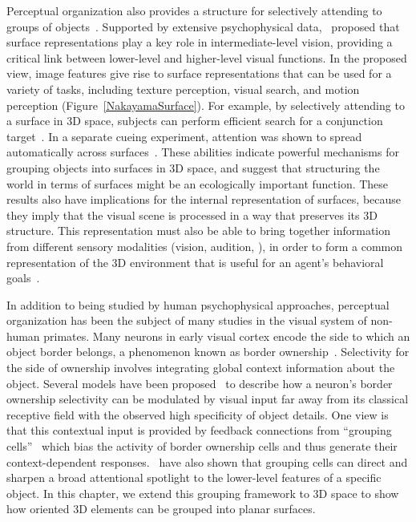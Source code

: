 Perceptual organization also provides a structure for selectively attending to groups of objects~\citep{Treisman_Gelade80}. Supported by extensive psychophysical data,~\citet{Nakayama_etal95} proposed that surface representations play a key role in intermediate-level vision, 
%
providing a critical link
between lower-level and higher-level visual functions.
In the proposed view, image features give rise to surface representations that can be used for a variety of tasks, including texture perception, visual search, and motion perception (Figure~\ref{NakayamaSurface}).
%
For example, by selectively attending to a surface in 3D space, subjects can perform efficient search for a conjunction target~\citep{Nakayama_Silverman86}. In a separate cueing experiment, attention was shown to spread automatically across surfaces~\citep{He_Nakayama95}. These abilities indicate powerful mechanisms for grouping objects into surfaces in 3D space, and suggest that structuring the world in terms of surfaces might be an ecologically important function. These results also have implications for the internal representation of surfaces, because they imply that the visual scene is processed in a way that preserves its 3D
structure. This representation must also be able to bring together
information from different sensory modalities (\eg vision, audition,
\etc), in order to form a common representation of the 3D environment
that is useful for an agent's behavioral goals~\citep{Lewicki_etal14}.

In addition to being studied by human psychophysical approaches, perceptual organization has been the subject of many studies in the visual system of non-human primates. Many neurons in early visual cortex encode the side to which an object border belongs, a phenomenon known as border ownership~\citep{Zhou_etal00}. Selectivity for the side of ownership involves integrating global context information about the object. Several models have been proposed~\citep{Zhaoping05, Craft_etal07} to describe how a neuron's border ownership selectivity can be modulated by visual input far away from its classical receptive field with the observed high specificity of object details. One view is that this contextual input is provided by feedback connections from ``grouping cells''~\citep{Craft_etal07} which bias the activity of border ownership cells and thus generate their context-dependent responses.~\citet{Mihalas_etal11b} have also shown that
grouping cells can direct and sharpen a broad attentional spotlight to the lower-level features of a specific object. In this chapter, we extend this grouping framework to 3D space to show how oriented 3D elements can be grouped into planar surfaces.

